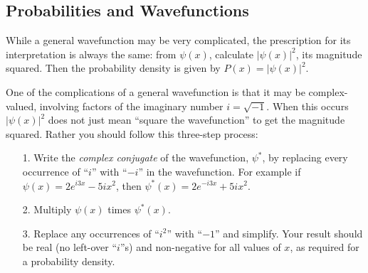 \subsection{Probabilities and Wavefunctions}
\label{sec:ProbDensity}
While a general wavefunction may be very complicated, the prescription
for its interpretation is always the same: from $\psi(x)$, calculate
$|\psi(x)|^2$, its magnitude squared.  Then the probability density is
given by $P(x)=|\psi(x)|^2$.

One of the complications of a general wavefunction is that it may be
complex-valued, involving factors of the imaginary number $ i = \sqrt{-1}$.  
When this occurs $|\psi(x)|^2$ does not just mean ``square the wavefunction''
to get the magnitude squared.  Rather you should follow this three-step
process:

\begin{enumerate}

\item[1.] Write the {\em complex conjugate} of the wavefunction, $\psi^*$,
  by replacing every occurrence of ``$i$'' with ``$-i$'' in the
  wavefunction.  For example if $\psi(x) = 2 e^{i3x} - 5 i x^2$, then
  $\psi^*(x) = 2 e^{-i3x} + 5 i x^2$.

\item[2.]  Multiply $\psi(x)$ times $\psi^*(x)$.

\item[3.] Replace any occurrences of ``$i^2$'' with ``$-1$'' and
  simplify. Your result should be real (no left-over ``$i$''s) and
  non-negative for all values of $x$, as required for a probability
  density.

\end{enumerate}

